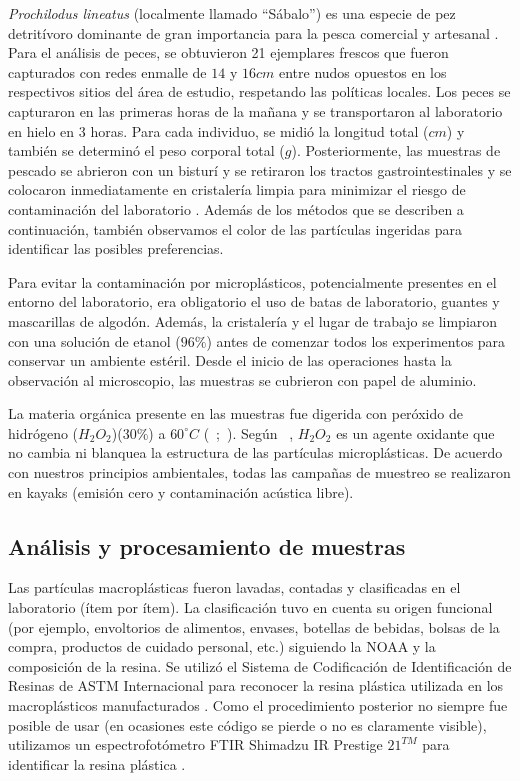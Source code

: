 \textit{Prochilodus lineatus} (localmente llamado ``Sábalo'') es una especie de pez detritívoro dominante de gran importancia para la pesca comercial y artesanal \parencite{espinola2016response}. Para el análisis de peces, se obtuvieron 21 ejemplares frescos que fueron capturados con redes enmalle de $14$ y $16cm$ entre nudos opuestos en los respectivos sitios del área de estudio, respetando las políticas locales. Los peces se capturaron en las primeras horas de la mañana y se transportaron al laboratorio en hielo en 3 horas. Para cada individuo, se midió la longitud total ($cm$) y también se determinó el peso corporal total ($g$). Posteriormente, las muestras de pescado se abrieron con un bisturí y se retiraron los tractos gastrointestinales y se colocaron inmediatamente en cristalería limpia para minimizar el riesgo de contaminación del laboratorio \parencite{BESSA2018575}. Además de los métodos que se describen a continuación, también observamos el color de las partículas ingeridas para identificar las posibles preferencias.

Para evitar la contaminación por microplásticos, potencialmente presentes en el entorno del laboratorio, era obligatorio el uso de batas de laboratorio, guantes y mascarillas de algodón. Además, la cristalería y el lugar de trabajo se limpiaron con una solución de etanol ($96\%$) antes de comenzar todos los experimentos para conservar un ambiente estéril. Desde el inicio de las operaciones hasta la observación al microscopio, las muestras se cubrieron con papel de aluminio.

La materia orgánica presente en las muestras fue digerida con peróxido de hidrógeno ($H_2O_2$)($30\%$) a $60 ^{\circ}C$ (~\cite{PAZOS201785};~\cite{JABEEN2017141}). Según ~\cite{JABEEN2017141}, $H_2O_2$ es un agente oxidante que no cambia ni blanquea la estructura de las partículas microplásticas. De acuerdo con nuestros principios ambientales, todas las campañas de muestreo se realizaron en kayaks (emisión cero y contaminación acústica libre).

\subsection{Análisis y procesamiento de muestras}
Las partículas macroplásticas fueron lavadas, contadas y clasificadas en el laboratorio (ítem por ítem). La clasificación tuvo en cuenta su origen funcional (por ejemplo, envoltorios de alimentos, envases, botellas de bebidas, bolsas de la compra, productos de cuidado personal, etc.) siguiendo la NOAA \parencite{lippiatt2013marine} y la composición de la resina. Se utilizó el Sistema de Codificación de Identificación de Resinas de ASTM Internacional \parencite{RIC} para reconocer la resina plástica utilizada en los macroplásticos manufacturados \parencite{GASPERI2014163}. Como el procedimiento posterior no siempre fue posible de usar (en ocasiones este código se pierde o no es claramente visible), utilizamos un espectrofotómetro FTIR Shimadzu IR Prestige $21^{TM}$ para identificar la resina plástica \parencite{SONG2015202}.

